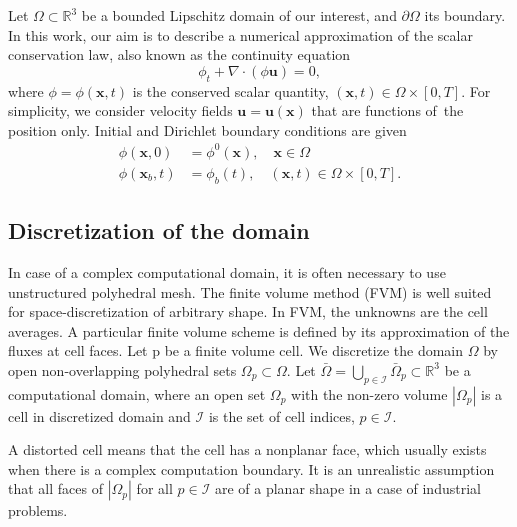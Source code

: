 \documentclass[../thesis.tex]{subfiles}
\begin{document}
Let \(\Omega \subset \mathbb{R}^3 \) be a bounded Lipschitz
domain of our interest, and \(\partial \Omega\) its boundary. In this work,
our aim is to describe a numerical approximation of the scalar conservation
law, also known as the continuity equation
\begin{equation}\label{eqn:scalar-conservation-law-3d}
	\phi_t
	+ \nabla \cdot \left( \phi \mathbf{u} \right) = 0,
\end{equation}
where \(\phi = \phi(\mathbf{x},t)\) is the conserved scalar quantity,
\(\left( \mathbf{x}, t \right) \in \Omega \times \left[ 0,T \right]\).
For simplicity, we consider velocity fields
\(\mathbf{u} = \mathbf{u}(\mathbf{x})\) that are functions of~the
position only.
Initial and Dirichlet boundary conditions are given
\begin{align}
	\phi(\mathbf{x},0) &= \phi^0(\mathbf{x}), \quad \mathbf{x} \in \Omega\\
	\phi(\mathbf{x}_b,t) &= \phi_b(t), \quad (\mathbf{x}, t) \in \Omega \times
	\left[ 0,T \right].
\end{align}
\subsection{Discretization of the domain}
In case of a complex computational domain, it is often
necessary to use unstructured polyhedral mesh.
The finite volume method (FVM) is well suited for space-discretization of
arbitrary shape. In FVM, the unknowns are the cell averages.
A particular finite volume scheme is defined by its approximation of
the fluxes at cell faces.
Let p be a finite volume cell. We discretize the domain \(\Omega\)
by open non-overlapping polyhedral sets \(\Omega_p \subset \Omega\).
Let \(\bar{\Omega} =
\bigcup_{p \in \mathcal{I}} \bar{\Omega}_p \subset \mathbb{R}^3\)
be a computational domain, where an open set \(\Omega_p\) with the non-zero volume
\(|\Omega_p|\) is a cell in discretized domain and \(\mathcal{I}\) is the set
of cell indices, \(p \in \mathcal{I}\).

A distorted cell means that the cell has a nonplanar face,
which usually exists when there is a complex computation boundary. It is an
unrealistic assumption that all faces of \(|\Omega_p|\) for all
\(p \in \mathcal{I}\) are of a planar shape in a case of industrial problems.
\end{document}
